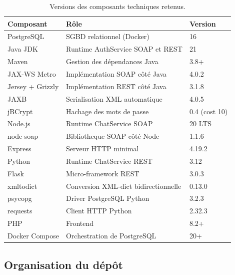 \begin{table}[ht]
  \centering
  \caption{Versions des composants techniques retenus.}
  \label{tab:stack-versions}
  \begin{tabularx}{\linewidth}{l X l}
    \toprule
    \textbf{Composant} & \textbf{Rôle} & \textbf{Version} \\
    \midrule
    PostgreSQL          & SGBD relationnel (Docker)               & 16 \\
    Java JDK            & Runtime AuthService SOAP et REST        & 21 \\
    Maven               & Gestion des dépendances Java            & 3.8+ \\
    JAX-WS Metro        & Implémentation SOAP côté Java           & 4.0.2 \\
    Jersey + Grizzly    & Implémentation REST côté Java           & 3.1.8 \\
    JAXB                & Serialisation XML automatique           & 4.0.5 \\
    jBCrypt             & Hachage des mots de passe               & 0.4 (cost 10) \\
    Node.js             & Runtime ChatService SOAP                & 20 LTS \\
    node-soap           & Bibliotheque SOAP côté Node             & 1.1.6 \\
    Express             & Serveur HTTP minimal                    & 4.19.2 \\
    Python              & Runtime ChatService REST                & 3.12 \\
    Flask               & Micro-framework REST                    & 3.0.3 \\
    xmltodict           & Conversion XML-dict bidirectionnelle    & 0.13.0 \\
    psycopg             & Driver PostgreSQL Python                & 3.2.3 \\
    requests            & Client HTTP Python                      & 2.32.3 \\
    PHP                 & Frontend                                & 8.2+ \\
    Docker Compose      & Orchestration de PostgreSQL             & 20+ \\
    \bottomrule
  \end{tabularx}
\end{table}

\subsection{Organisation du dépôt}

